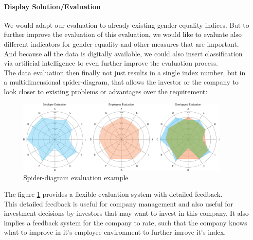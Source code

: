 \paragraph*{Display Solution/Evaluation}
We would adapt our evaluation to already existing gender-equality indices. But to further improve the evaluation of this evaluation, we would like to evaluate also different indicators for gender-equality and other measures that are important.\\
And because all the data is digitally available, we could also insert classification via artificial intelligence to even further improve the evaluation process.\\
The data evaluation then finally not just results in a single index number, but in a multidimensional spider-diagram, that allows the investor or the company to look closer to existing problems or advantages over the requirement:
\begin{figure}[H]
	\includegraphics[width=0.95\textwidth]{Bilder/spider-eval}
	\caption{Spider-diagram evaluation example}
	\label{Spider_diagram_evaluation}
\end{figure}
The figure \ref{Spider_diagram_evaluation} provides a flexible evaluation system with detailed feedback.\\
This detailed feedback is useful for company management and also useful for investment decisions by investors that may want to invest in this company. It also implies a feedback system for the company to rate, such that the company knows what to improve in it's employee environment to further imrove it's index.